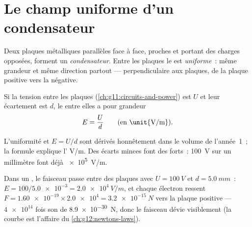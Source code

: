 \section{Le champ uniforme d'un condensateur}

\begin{definition}\label{def:g11:electric-gravitational-fields:capacitor}
Deux plaques métalliques parallèles face à face, proches et portant des
charges opposées, forment un \emph{condensateur}.
Entre les plaques le  est
\emph{uniforme}~: même grandeur et même direction
partout --- perpendiculaire aux plaques, de la plaque positive vers la
négative.
\end{definition}

\begin{proposition}\label{prop:g11:electric-gravitational-fields:uniform}
Si la tension entre les plaques
(\cref{ch:g11:circuits-and-power}) est $U$ et leur écartement est $d$, le
 entre elles a pour grandeur
\[
E = \frac{U}{d} \qquad \text{(en \unit{V/m})}.
\]
\end{proposition}
\admitted

\begin{remark}
L'uniformité et $E = U/d$ sont dérivés honnêtement dans le volume de
l'année~1~; la formule explique l'
\unit{V/m}. Des écarts minces font des
 forts~: \qty{100}{V} sur un
millimètre font déjà \qty{e5}{V/m}.
\end{remark}

\begin{example}\label{ex:g11:electric-gravitational-fields:beam}
Dans un , le faisceau passe
entre des plaques avec $U = \qty{100}{V}$ et $d = \qty{5.0}{mm}$~:
$E = 100 / \num{5.0e-3} = \qty{2.0e4}{V/m}$, et chaque électron ressent
$F = \num{1.60e-19} \times \num{2.0e4} = \qty{3.2e-15}{N}$ vers la
plaque positive --- $\num{4e14}$ fois son
 de \qty{8.9e-30}{N}, donc le
faisceau dévie visiblement (la  courbe est l'affaire du
\cref{ch:g12:newtons-laws}).
\end{example}

